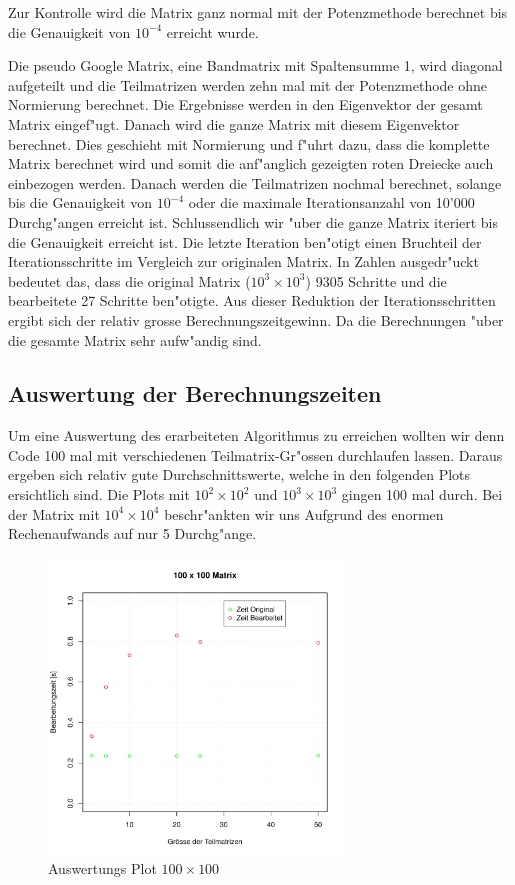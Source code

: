 \begin{refsection}
Zur Kontrolle wird die Matrix ganz normal mit der Potenzmethode
berechnet bis die Genauigkeit von $10^{-4}$ erreicht wurde.

Die pseudo Google Matrix, eine Bandmatrix mit Spaltensumme 1, wird
diagonal aufgeteilt und die Teilmatrizen werden zehn mal mit der
Potenzmethode ohne Normierung berechnet. Die Ergebnisse werden in den
Eigenvektor der gesamt Matrix eingef"ugt. Danach wird die ganze Matrix
mit diesem Eigenvektor berechnet. Dies geschieht mit Normierung und
f"uhrt dazu, dass die komplette Matrix berechnet wird und somit die
anf"anglich gezeigten roten Dreiecke auch einbezogen werden. Danach
werden die Teilmatrizen nochmal berechnet, solange bis die Genauigkeit
von $10^{-4}$ oder die maximale Iterationsanzahl von 10'000
Durchg"angen erreicht ist. Schlussendlich wir "uber die ganze Matrix
iteriert bis die Genauigkeit erreicht ist. Die letzte Iteration
ben"otigt einen Bruchteil der Iterationsschritte im Vergleich zur
originalen Matrix. In Zahlen ausgedr"uckt bedeutet das, dass die
original Matrix ($10^3\times10^3$) 9305 Schritte und die bearbeitete
27 Schritte ben"otigte. Aus dieser Reduktion der Iterationsschritten
ergibt sich der relativ grosse Berechnungszeitgewinn. Da die
Berechnungen "uber die gesamte Matrix sehr aufw"andig sind.

\subsection[Auswertung]{Auswertung der Berechnungszeiten}
Um eine Auswertung des erarbeiteten Algorithmus zu erreichen wollten
wir denn Code 100 mal mit verschiedenen Teilmatrix-Gr"ossen
durchlaufen lassen. Daraus ergeben sich relativ gute
Durchschnittswerte, welche in den folgenden Plots ersichtlich
sind. Die Plots mit $10^2\times10^2$ und $10^3\times10^3$ gingen 100
mal durch. Bei der Matrix mit $10^4\times10^4$ beschr"ankten wir uns
Aufgrund des enormen Rechenaufwands auf nur 5 Durchg"ange.

\begin{figure}
\begin{center}
\includegraphics[width=0.7\textwidth]{./mapreduce/PC100.pdf}
\end{center}
\caption{Auswertungs Plot $100\times100$}
\label{q}
\end{figure}


\end{refsection}
